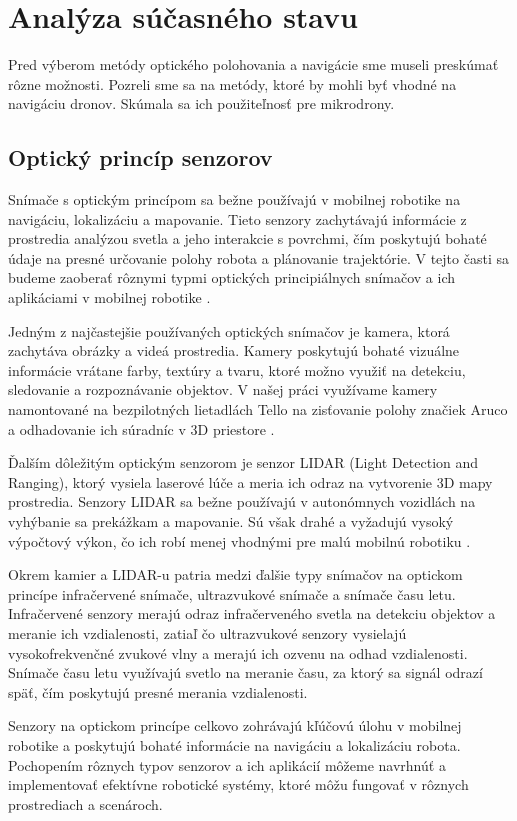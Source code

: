 \section{Analýza súčasného stavu}
Pred výberom metódy optického polohovania a navigácie sme museli preskúmať rôzne možnosti. Pozreli sme sa na metódy, ktoré by mohli byť vhodné na navigáciu dronov. Skúmala sa ich použiteľnosť pre mikrodrony.

\subsection{Optický princíp senzorov}
Snímače s optickým princípom sa bežne používajú v mobilnej robotike na navigáciu, lokalizáciu a mapovanie. Tieto senzory zachytávajú informácie z prostredia analýzou svetla a jeho interakcie s povrchmi, čím poskytujú bohaté údaje na presné určovanie polohy robota a plánovanie trajektórie. V tejto časti sa budeme zaoberať rôznymi typmi optických principiálnych snímačov a ich aplikáciami v mobilnej robotike \citep{Li2022}.

Jedným z najčastejšie používaných optických snímačov je kamera, ktorá zachytáva obrázky a videá prostredia. Kamery poskytujú bohaté vizuálne informácie vrátane farby, textúry a tvaru, ktoré možno využiť na detekciu, sledovanie a rozpoznávanie objektov. V našej práci využívame kamery namontované na bezpilotných lietadlách Tello na zisťovanie polohy značiek Aruco a odhadovanie ich súradníc v 3D priestore \citep{Li2022}. 

Ďalším dôležitým optickým senzorom je senzor LIDAR (Light Detection and Ranging), ktorý vysiela laserové lúče a meria ich odraz na vytvorenie 3D mapy prostredia. Senzory LIDAR sa bežne používajú v autonómnych vozidlách na vyhýbanie sa prekážkam a mapovanie. Sú však drahé a vyžadujú vysoký výpočtový výkon, čo ich robí menej vhodnými pre malú mobilnú robotiku \citep{Takahashi2014}.
 
Okrem kamier a LIDAR-u patria medzi ďalšie typy snímačov na optickom princípe infračervené snímače, ultrazvukové snímače a snímače času letu. Infračervené senzory merajú odraz infračerveného svetla na detekciu objektov a meranie ich vzdialenosti, zatiaľ čo ultrazvukové senzory vysielajú vysokofrekvenčné zvukové vlny a merajú ich ozvenu na odhad vzdialenosti. Snímače času letu využívajú svetlo na meranie času, za ktorý sa signál odrazí späť, čím poskytujú presné merania vzdialenosti.

Senzory na optickom princípe celkovo zohrávajú kľúčovú úlohu v mobilnej robotike a poskytujú bohaté informácie na navigáciu a lokalizáciu robota. Pochopením rôznych typov senzorov a ich aplikácií môžeme navrhnúť a implementovať efektívne robotické systémy, ktoré môžu fungovať v rôznych prostrediach a scenároch.

